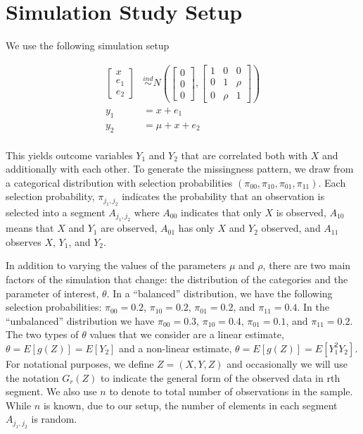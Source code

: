 \documentclass[12pt]{article}
\begin{document}

\section*{Simulation Study Setup}

We use the following simulation setup

\begin{align*}
  \begin{bmatrix} x \\ e_1 \\ e_2 \end{bmatrix} 
  &\stackrel{ind}{\sim} N\left(\begin{bmatrix} 0 \\ 0 \\ 0 \end{bmatrix}, 
  \begin{bmatrix} 1 & 0 & 0 \\ 0 & 1 & \rho \\ 0 & \rho & 1 \end{bmatrix}\right) \\
  y_1 &= x + e_1 \\
  y_2 &= \mu + x + e_2 \\
\end{align*}

This yields outcome variables $Y_1$ and $Y_2$ that are correlated both with $X$
and additionally with each other. To generate the missingness pattern, we draw 
from a categorical distribution with selection probabilities $(\pi_{00}, \pi_{10},
\pi_{01}, \pi_{11})$. Each selection probability, $\pi_{j_1, j_2}$ indicates 
the probability that an observation is selected into a segment $A_{j_1, j_2}$ 
where $A_{00}$ indicates that only $X$ is observed, $A_{10}$ means that $X$ and
$Y_1$ are observed, $A_{01}$ has only $X$ and $Y_2$ observed, and $A_{11}$
observes $X$, $Y_1$, and $Y_2$.

In addition to varying the values of the parameters $\mu$ and $\rho$, there
are two main factors of the simulation that change: the distribution of the
categories and the parameter of interest, $\theta$. In a ``balanced''
distribution, we have the following selection probabilities: $\pi_{00} = 0.2$,
$\pi_{10} = 0.2$, $\pi_{01} = 0.2$, and $\pi_{11} = 0.4$. In the ``unbalanced''
distribution we have $\pi_{00} = 0.3$, $\pi_{10} = 0.4$, $\pi_{01} = 0.1$, and
$\pi_{11} = 0.2$. The two types of $\theta$ values that we consider are a
linear estimate, $\theta = E[g(Z)] = E[Y_2]$ and a non-linear estimate, 
$\theta = E[g(Z)] = E[Y_1^2 Y_2]$. For notational purposes, we define $Z = (X,
Y, Z)$ and occasionally we will use the notation $G_r(Z)$ to indicate the
general form of the observed data in rth segment. We also use $n$ to denote to
total number of observations in the sample. While $n$ is known, due to our
setup, the number of elements in each segment $A_{j_1, j_2}$ is random.
\end{document}

